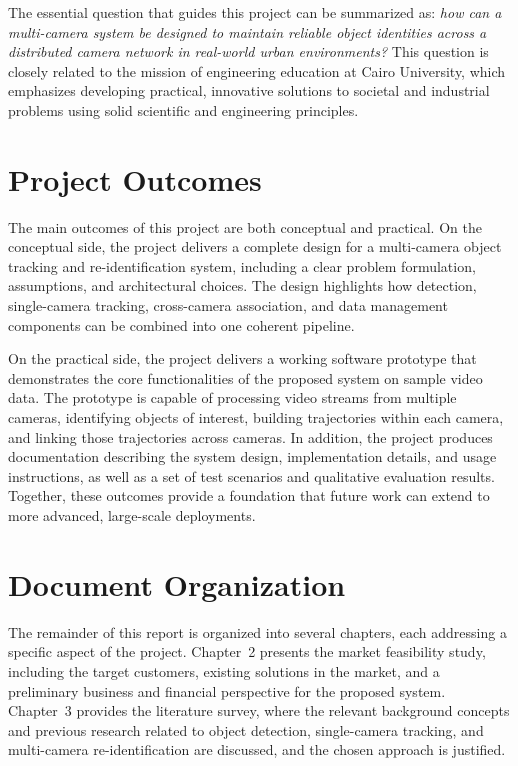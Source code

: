 The essential question that guides this project can be summarized as: \textit{how can a multi-camera system be designed to maintain reliable object identities across a distributed camera network in real-world urban environments?} This question is closely related to the mission of engineering education at Cairo University, which emphasizes developing practical, innovative solutions to societal and industrial problems using solid scientific and engineering principles.

\section{Project Outcomes}

The main outcomes of this project are both conceptual and practical. On the conceptual side, the project delivers a complete design for a multi-camera object tracking and re-identification system, including a clear problem formulation, assumptions, and architectural choices. The design highlights how detection, single-camera tracking, cross-camera association, and data management components can be combined into one coherent pipeline.

On the practical side, the project delivers a working software prototype that demonstrates the core functionalities of the proposed system on sample video data. The prototype is capable of processing video streams from multiple cameras, identifying objects of interest, building trajectories within each camera, and linking those trajectories across cameras. In addition, the project produces documentation describing the system design, implementation details, and usage instructions, as well as a set of test scenarios and qualitative evaluation results. Together, these outcomes provide a foundation that future work can extend to more advanced, large-scale deployments.

\section{Document Organization}

The remainder of this report is organized into several chapters, each addressing a specific aspect of the project. Chapter~2 presents the market feasibility study, including the target customers, existing solutions in the market, and a preliminary business and financial perspective for the proposed system. Chapter~3 provides the literature survey, where the relevant background concepts and previous research related to object detection, single-camera tracking, and multi-camera re-identification are discussed, and the chosen approach is justified.

